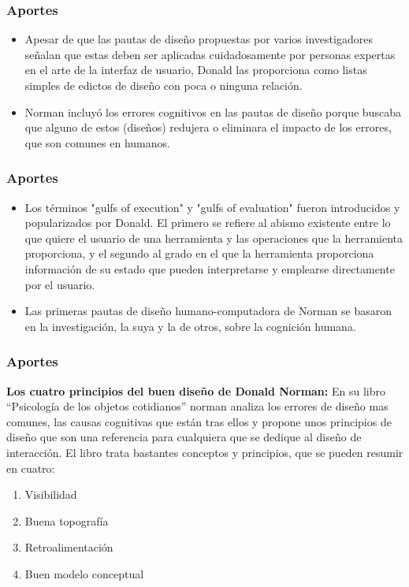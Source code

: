 \documentclass[11pt]{beamer}
\begin{document}
\begin{frame}
\frametitle{Aportes}
\begin{itemize}

\item Apesar de que las pautas de diseño propuestas por varios investigadores señalan que estas deben ser aplicadas cuidadosamente por personas expertas en el arte de la interfaz de usuario, Donald las proporciona como listas simples de edictos de diseño con poca o ninguna relación.
\item Norman incluyó los errores cognitivos en las pautas de diseño porque buscaba que alguno de estos (diseños) redujera o eliminara el impacto de los errores, que son comunes en humanos. 

\end{itemize}
\end{frame}

\begin{frame}
\frametitle{Aportes}
\begin{itemize}
\item Los términos "gulfs of execution" y "gulfs of evaluation" fueron introducidos y popularizados por Donald. El primero se refiere al abismo existente entre lo que quiere el usuario de una herramienta y las operaciones que la herramienta proporciona, y el segundo al grado en el que la herramienta proporciona información de su estado que pueden interpretarse y emplearse directamente por el usuario.
\item Las primeras pautas de diseño humano-computadora de Norman se basaron en la investigación, la suya y la de otros, sobre la cognición humana.

\end{itemize}
\end{frame}

\begin{frame}
\frametitle{Aportes}

\textbf{Los cuatro principios del buen diseño de Donald Norman:}
En su libro “Psicología de los objetos cotidianos” norman analiza los errores de diseño mas comunes, las causas cognitivas que están tras ellos y propone unos principios de diseño que son una referencia para cualquiera que se dedique al diseño de interacción. El libro trata bastantes conceptos y principios, que se pueden resumir en cuatro:

\begin{enumerate}
    \item Visibilidad
    \item Buena topografía
    \item Retroalimentación
    \item Buen modelo conceptual
\end{enumerate}

\end{frame}
\end{document}

